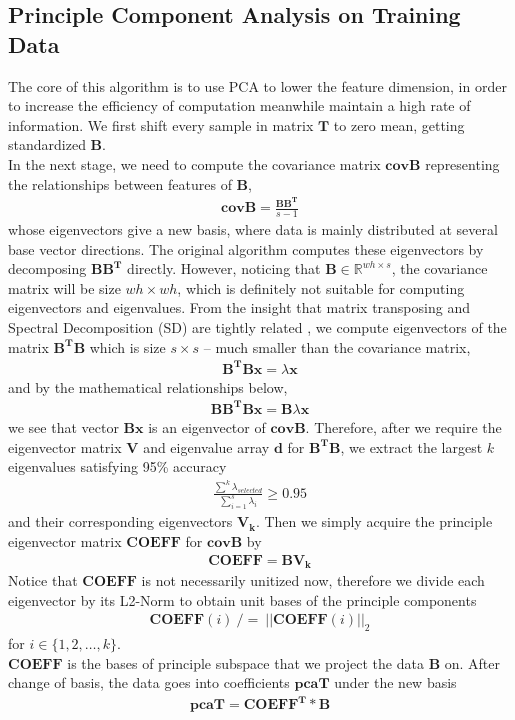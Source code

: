 \documentclass[10pt,journal]{IEEEtran}
\renewcommand{\[}{\begin{equation*} \begin{aligned}} %
\renewcommand{\]}{\end{aligned} \end{equation*}}
\begin{document}
\subsection{\large Principle Component Analysis on Training Data}
The core of this algorithm is to use PCA to lower the feature dimension, in order to increase the efficiency of computation meanwhile maintain a high rate of information. We first shift every sample in matrix $\mathbf{T}$ to zero mean, getting standardized $\mathbf{B}$. \\

In the next stage, we need to compute the covariance matrix $\mathbf{covB}$ representing the relationships between features of $\mathbf{B}$,
\[
	\mathbf{covB} = \frac{\mathbf{B B^T}}{s-1}
\]
whose eigenvectors give a new basis, where data is mainly distributed at several base vector directions. The original algorithm computes these eigenvectors by decomposing $\mathbf{B B^T}$ directly. However, noticing that $\mathbf{B} \in \mathbb{R}^{wh \times s}$, the covariance matrix will be size $wh \times wh$, which is definitely not suitable for computing eigenvectors and eigenvalues. From the insight that matrix transposing and Spectral Decomposition (SD) are tightly related \cite{cnki1}, we compute eigenvectors of the matrix $\mathbf{B^T B}$ which is size $s \times s$ -- much smaller than the covariance matrix,
\[
	\mathbf{B^T B x} = \lambda \mathbf{x}
\]
and by the mathematical relationships below,
\[
	\mathbf{B B^T B x} = \mathbf{B} \lambda \mathbf{x}
\]
we see that vector $\mathbf{B x}$ is an eigenvector of $\mathbf{covB}$. Therefore, after we require the eigenvector matrix $\mathbf{V}$ and eigenvalue array $\mathbf{d}$ for $\mathbf{B^T B}$, we extract the largest $k$ eigenvalues satisfying 95\% accuracy
\[
	\frac{\sum^k \lambda_{selected}}{\sum_{i=1}^s \lambda_i} \ge 0.95
\]
and their corresponding eigenvectors $\mathbf{V_k}$. Then we simply acquire the principle eigenvector matrix $\mathbf{COEFF}$ for $\mathbf{covB}$ by
\[
	\mathbf{COEFF = B V_k}
\]
Notice that $\mathbf{COEFF}$ is not necessarily unitized now, therefore we divide each eigenvector by its L2-Norm to obtain unit bases of the principle components
\[
	\mathbf{COEFF}(i) \ /= \ ||\mathbf{COEFF}(i)||_2
\]
for $i \in \{1, 2, \dots , k\}$. \\

$\mathbf{COEFF}$ is the bases of principle subspace that we project the data $\mathbf{B}$ on. After change of basis, the data goes into coefficients $\mathbf{pcaT}$ under the new basis
\[
	\mathbf{pcaT = COEFF^T * B}
\]
\end{document}
